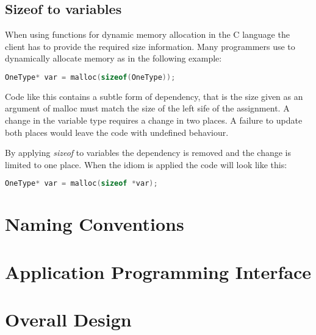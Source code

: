 \subsection{Sizeof to variables}
When using functions for dynamic memory allocation in the C language the client has to provide the required size information. Many programmers use to dynamically allocate memory as in the following example:
\begin{lstlisting}[language=C]
OneType* var = malloc(sizeof(OneType));
\end{lstlisting}

Code like this contains a subtle form of dependency, that is the size given as an argument of malloc must match the size of the left sife of the assignment. A change in the variable type requires a change in two places. A failure to update both places would leave the code with undefined behaviour.

By applying \textit{sizeof} to variables the dependency is removed and the change is limited to one place. When the idiom is applied the code will look like this:
\begin{lstlisting}[language=C]
OneType* var = malloc(sizeof *var);
\end{lstlisting}

\section{Naming Conventions}

\section{Application Programming Interface}

\section{Overall Design}
